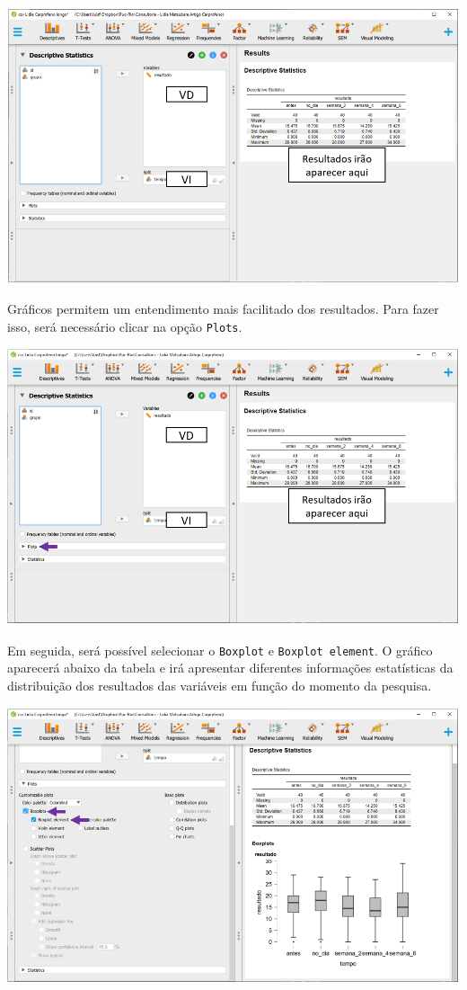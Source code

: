 \documentclass[
]{book}
\begin{document}
\includegraphics{./img/cap_lmm_descriptives3.png}

Gráficos permitem um entendimento mais facilitado dos resultados. Para fazer isso, será necessário clicar na opção \texttt{Plots}.

\includegraphics{./img/cap_lmm_plots.png}

Em seguida, será possível selecionar o \texttt{Boxplot} e \texttt{Boxplot\ element}. O gráfico aparecerá abaixo da tabela e irá apresentar diferentes informações estatísticas da distribuição dos resultados das variáveis em função do momento da pesquisa.

\includegraphics{./img/cap_lmm_boxplots1.png}
\end{document}
